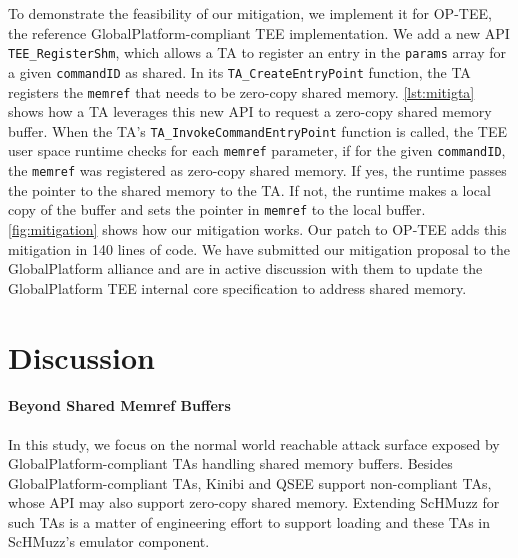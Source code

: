 \documentclass[conference]{IEEEtran}
\newcommand{\sysname}{ScHMuzz\xspace}
\newcommand{\optee}{OP-TEE\xspace}
\newcommand{\kinibi}{Kinibi\xspace}
\newcommand{\qsee}{QSEE\xspace}
\begin{document}
To demonstrate the feasibility of our mitigation, we implement it for \optee, the 
reference GlobalPlatform-compliant TEE implementation. We add a new API \texttt{TEE\_RegisterShm}, 
which allows a TA to register an entry in the \texttt{params} array for a given 
\texttt{commandID} as shared. In its \texttt{TA\_CreateEntryPoint} function, the 
TA registers the \texttt{memref} that needs to be zero-copy shared memory. 
\autoref{lst:mitigta} shows how a TA leverages this new API to request a
zero-copy shared memory buffer. When the TA's \texttt{TA\_InvokeCommandEntryPoint} function is called, the TEE user 
space runtime checks for each \texttt{memref} parameter, if for the given 
\texttt{commandID}, the \texttt{memref} was registered as zero-copy shared memory. 
If yes, the runtime passes the pointer to the shared memory to the TA. 
If not, the runtime makes a local copy of the 
buffer and sets the pointer in \texttt{memref} to the local buffer.
\autoref{fig:mitigation} shows how our mitigation works.
Our patch to \optee adds this mitigation in 140 lines 
of code.
We have submitted our mitigation proposal to the GlobalPlatform alliance and are 
in active discussion with them to update the GlobalPlatform TEE internal core 
specification to address shared memory.

\begin{listing}[h]
    
    \label{lst:mitigta}
\end{listing}

\section{Discussion}\label{sec:discussion}

\paragraph{Beyond Shared Memref Buffers}
In this study, we focus on the normal world reachable attack surface exposed by 
GlobalPlatform-compliant TAs handling shared memory buffers. 
Besides GlobalPlatform-compliant TAs, \kinibi and \qsee support non-compliant TAs, 
whose API may also support zero-copy shared memory. Extending 
\sysname for such TAs is a matter of engineering effort to support loading and 
these TAs in \sysname's emulator component. 
\end{document}
